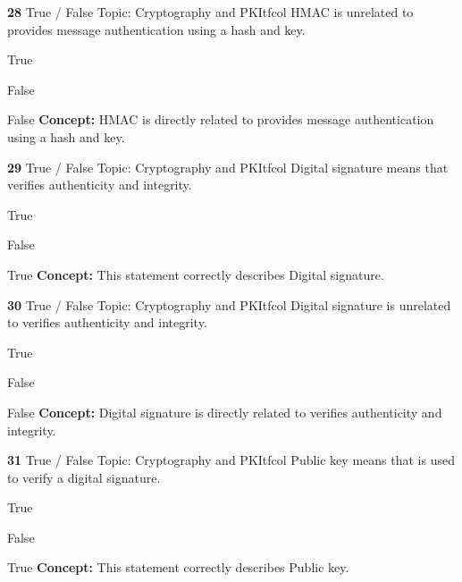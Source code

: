 \documentclass[10pt,a4paper]{article}
\begin{document}
\begin{qcard}{\color{white}\textbf{28} \hfill \small True / False \textbar{} Topic: Cryptography and PKI}{tfcol}
HMAC is unrelated to provides message authentication using a hash and key.

\begin{qoptions}
\item True
\item False
\end{qoptions}
\begin{explainbox}{False}
\textbf{Concept:} HMAC is directly related to provides message authentication using a hash and key.
\end{explainbox}
\end{qcard}

\begin{qcard}{\color{white}\textbf{29} \hfill \small True / False \textbar{} Topic: Cryptography and PKI}{tfcol}
Digital signature means that verifies authenticity and integrity.

\begin{qoptions}
\item True
\item False
\end{qoptions}
\begin{explainbox}{True}
\textbf{Concept:} This statement correctly describes Digital signature.
\end{explainbox}
\end{qcard}

\begin{qcard}{\color{white}\textbf{30} \hfill \small True / False \textbar{} Topic: Cryptography and PKI}{tfcol}
Digital signature is unrelated to verifies authenticity and integrity.

\begin{qoptions}
\item True
\item False
\end{qoptions}
\begin{explainbox}{False}
\textbf{Concept:} Digital signature is directly related to verifies authenticity and integrity.
\end{explainbox}
\end{qcard}

\begin{qcard}{\color{white}\textbf{31} \hfill \small True / False \textbar{} Topic: Cryptography and PKI}{tfcol}
Public key means that is used to verify a digital signature.

\begin{qoptions}
\item True
\item False
\end{qoptions}
\begin{explainbox}{True}
\textbf{Concept:} This statement correctly describes Public key.
\end{explainbox}
\end{qcard}
\end{document}
